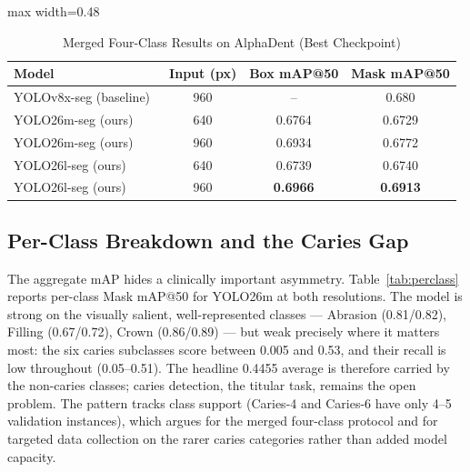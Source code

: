 \documentclass[conference]{IEEEtran}
\begin{document}
\begin{table}[htbp]
\caption{Merged Four-Class Results on AlphaDent (Best Checkpoint)}
\label{tab:results4}
\centering
\begin{adjustbox}{max width=0.48\textwidth}
\begin{tabular}{lccc}
\toprule
\textbf{Model} & \textbf{Input (px)} & \textbf{Box mAP@50} & \textbf{Mask mAP@50} \\
\midrule
YOLOv8x-seg (baseline)~\cite{sosnin2025alphadent} & 960 & -- & 0.680 \\
\rowcolor{highlightColor}
YOLO26m-seg (ours) & 640 & 0.6764 & 0.6729 \\
\rowcolor{highlightColor}
YOLO26m-seg (ours) & 960 & 0.6934 & 0.6772 \\
\rowcolor{highlightColor}
YOLO26l-seg (ours) & 640 & 0.6739 & 0.6740 \\
\rowcolor{highlightColor}
YOLO26l-seg (ours) & 960 & \textbf{0.6966} & \textbf{0.6913} \\
\bottomrule
\end{tabular}
\end{adjustbox}
\end{table}

\subsection{Per-Class Breakdown and the Caries Gap}
The aggregate mAP hides a clinically important asymmetry. Table~\ref{tab:perclass} reports per-class Mask mAP@50 for YOLO26m at both resolutions. The model is strong on the visually salient, well-represented classes --- Abrasion (0.81/0.82), Filling (0.67/0.72), Crown (0.86/0.89) --- but weak precisely where it matters most: the six caries subclasses score between 0.005 and 0.53, and their recall is low throughout (0.05--0.51). The headline 0.4455 average is therefore carried by the non-caries classes; caries detection, the titular task, remains the open problem. The pattern tracks class support (Caries-4 and Caries-6 have only 4--5 validation instances), which argues for the merged four-class protocol and for targeted data collection on the rarer caries categories rather than added model capacity.
\end{document}

